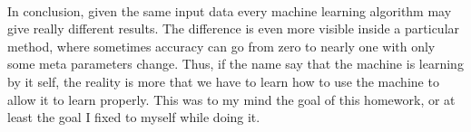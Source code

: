 \documentclass[twocolumn,a4paper,10pt]{article}
\begin{document}
\paragraph{}
In conclusion, given the same input data every machine learning algorithm may give really different results. The difference is even more visible inside a particular method, where sometimes accuracy can go from zero to nearly one with only some meta parameters change. Thus, if the name say that the machine is learning by it self, the reality is more that we have to learn how to use the machine to allow it to learn properly. This was to my mind the goal of this homework, or at least the goal I fixed to myself while doing it.
\end{document}
